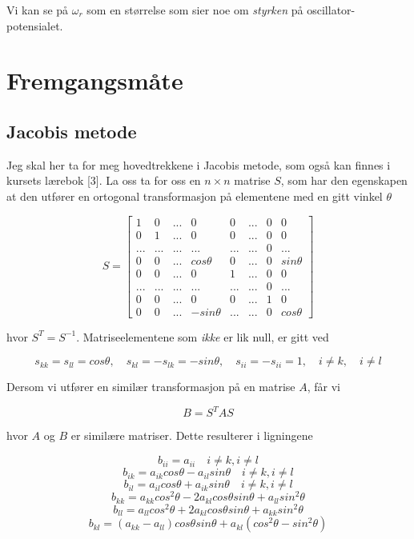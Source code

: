 \documentclass{article}
\begin{document}
Vi kan se på $\omega_r$ som en størrelse som sier noe om \textit{styrken} på oscillator-potensialet.


\section{Fremgangsmåte}
\subsection{Jacobis metode}
Jeg skal her ta for meg hovedtrekkene i Jacobis metode, som også kan finnes i kursets lærebok [3].
La oss ta for oss en $n \times n$ matrise $S$, som har den egenskapen at den utfører en ortogonal transformasjon på elementene med en gitt vinkel $\theta$

\[S = \begin{bmatrix} 1&0 &... &0 &0 &... &0 &0 \\ 
0& 1 & ... & 0 & 0 &... &0 &0 \\
 ...& ... & ... & ... & ... & ... & 0 &... \\ 
 0& 0 & ... & cos\theta &0 &... &0 &sin\theta \\
  0& 0 & ... & 0 & 1 & ... & 0 & 0\\ 
  ...& ... & ... & ... & ... & ... & 0 &... \\ 
  0 & 0 & ... & 0 & 0 & ... & 1 & 0\\
   0 & 0 & ... & -sin\theta & ... & ... & 0 & cos\theta \end{bmatrix}\]

hvor $S^T = S^{-1}$. Matriseelementene som \textit{ikke} er lik null, er gitt ved 

\[s_{kk} = s_{ll} = cos \theta, \quad s_{kl} = -s_{lk} = -sin\theta, \quad s_{ii} = -s_{ii} = 1, \quad i \neq k, \quad i \neq l \]

Dersom vi utfører en similær transformasjon på en matrise $A$, får vi 

\[B = S^T A S\]

hvor $A$ og $B$ er similære matriser. Dette resulterer i ligningene

\[b_{ii} = a_{ii} \quad i \neq k, i\neq l  \]
\[b_{ik} = a_{ik} cos\theta - a_{il} sin \theta \quad i \neq k, i \neq l \]
\[b_{il} = a_{il} cos \theta + a_{ik} sin \theta \quad i \neq k, i \neq l \]
\[ b_{kk} = a_{kk} cos^2\theta - 2a_{kl} cos \theta sin \theta + a_{ll} sin^2 \theta \]
\[ b_{ll} = a_ {ll}cos^2\theta + 2a_{kl} cos \theta sin\theta + a_{kk} sin^2 \theta \]
\[ b_{kl} = (a_{kk} - a_{ll} ) cos \theta sin \theta + a_{kl}(cos^2 \theta - sin^2 \theta ) \]
\end{document}
